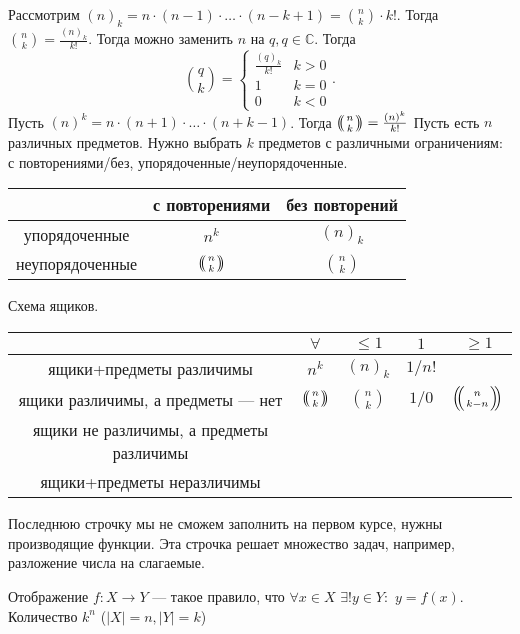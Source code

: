 Рассмотрим $(n)_k = n \cdot (n-1) \cdot \ldots \cdot (n-k+1) = \binom{n}{k} \cdot k!$. Тогда $\binom{n}{k} = \frac{(n)_k}{k!}$. Тогда можно заменить  $n$ на  $q, q \in \mathbb{C}$. Тогда  \[
    \binom{q}{k} = \begin{cases} \frac{(q)_k}{k!} & k > 0 \\ 1 & k = 0 \\ 0 & k < 0 \end{cases}
.\]
Пусть $(n)^k = n \cdot (n+1) \cdot \ldots \cdot (n+k-1)$. Тогда $\multiset{n}{k} = \frac{(n)^k}{k!}$
Пусть есть $n$ различных предметов. Нужно выбрать $k$ предметов с различными ограничениям: с повторениями/без, упорядоченные/неупорядоченные. 
\begin{center}
    \begin{tabular}{|c|c|c|}
        \hline
        & с повторениями & без повторений \\ \hline
        упорядоченные & $n^k$ &  $(n)_k$ \\ \hline
        неупорядоченные &  $\multiset{n}{k}$ &  $\binom{n}{k}$\\
        \hline
    \end{tabular}
\end{center}
Схема ящиков. 

\begin{center}
    \begin{tabular}{|c|c|c|c|c|}
        \hline
        & $\forall$ & $\le 1$ & $1$ &  $\ge 1$\\ \hline
        ящики+предметы различимы & $n^k$ & $(n)_k$ & $1 / n!$ & \\ \hline
        ящики различимы, а предметы --- нет & $\multiset{n}{k}$ & $\binom{n}{k}$ & $1 / 0$ & $\multiset{n}{k-n}$\\ \hline
        ящики не различимы, а предметы различимы & & & & \\ \hline
        ящики+предметы неразличимы & & & & \\ \hline
    \end{tabular}
\end{center}
Последнюю строчку мы не сможем заполнить на первом курсе, нужны производящие функции. Эта строчка решает множество задач, например, разложение числа на слагаемые.

Отображение $f: X \to Y$ --- такое правило, что $\forall x \in X$  $\exists! y \in Y:$  $y = f(x)$. Количество $k^n$ ($|X| = n, |Y| = k$)

